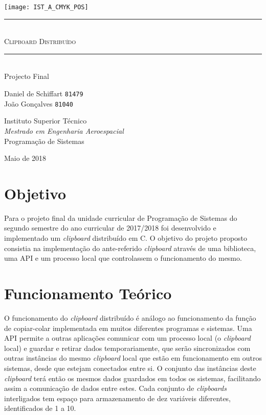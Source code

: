 \documentclass{article}
\begin{document}
\thispagestyle{empty}
	\texttt{[image: IST\_A\_CMYK\_POS]}
	
	\begin{center}
		\vspace{70mm} %
		\rule{\linewidth}{0.5pt} \\
		\Huge \textsc{Clipboard Distribuído} \\
		\rule{\linewidth}{2pt} \\
		\vspace{10mm} %
		\LARGE Projecto Final
		
		\vspace{\fill} %
		\large
		Daniel de Schiffart \texttt{81479} \\
		João Gonçalves \texttt{81040}
		
		\vspace{10mm} %
		\Large Instituto Superior Técnico \\
		\textit{Mestrado em Engenharia Aeroespacial} \\
		\vspace{1mm}
		\large Programação de Sistemas
		
		\vspace{10mm} %
		\Large Maio de 2018
	\end{center}
\newpage

\section{Objetivo}

Para o projeto final da unidade curricular de Programação de Sistemas do
segundo semestre do ano curricular de 2017/2018 foi desenvolvido e
implementado um \textit{clipboard} distribuído em C. O objetivo do
projeto proposto consistia na implementação do ante-referido 
\textit{clipboard} através de uma biblioteca, uma API e um processo
local que controlassem o funcionamento do mesmo.

\section{Funcionamento Teórico}

O funcionamento do \textit{clipboard} distribuído é análogo ao
funcionamento da função de copiar-colar implementada em muitos diferentes
programas e sistemas. Uma API permite a outras aplicações comunicar com
um processo local (o \textit{clipboard} local) e guardar e retirar dados
temporariamente, que serão sincronizados com outras instâncias do mesmo
\textit{clipboard} local que estão em funcionamento em outros sistemas,
desde que estejam conectados entre si. O conjunto das instâncias deste
\textit{clipboard} terá então os mesmos dados guardados em todos os
sistemas, facilitando assim a comunicação de dados entre estes.
Cada conjunto de \textit{clipboards} interligados tem espaço para
armazenamento de dez variáveis diferentes, identificados de 1 a 10.
\end{document}
